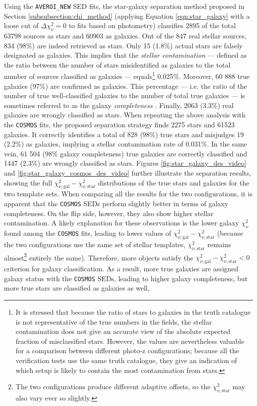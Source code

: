 Using the \texttt{AVEROI\_NEW} SED fits, the star-galaxy separation method proposed in Section \ref{subsubsection:chi_method} (applying Equation \ref{eqn:star_galaxy} with a loose cut of $\Delta \chi^2_{\nu} =0$ to fits based on \DESVIDEO photometry) classifies 2895 of the total \num{63 798} sources as stars and \num{60 903} as galaxies. Out of the 847 real stellar sources, 834 (98\%) are indeed retrieved as stars. Only 15 (1.8\%) actual stars are falsely designated as galaxies. This implies that the \textit{stellar contamination} --- defined as the ratio between the number of stars misidentified as galaxies to the total number of sources classified as galaxies \citep{2015MNRAS.450..666S} --- equals\footnote{It is stressed that because the ratio of stars to galaxies in the truth catalogue is not representative of the true numbers in the \DESVIDEO fields, the stellar contamination does not give an accurate view of the absolute expected fraction of misclassified stars. However, the values are nevertheless valuable for a comparison between different photo-z configurations; because all the verification tests use the same truth catalogue, they give an indication of which setup is likely to contain the most contamination from stars.} 0.025\%. Moreover, 60 888  true galaxies (97\%) are confirmed as galaxies. This percentage  --- i.e. the ratio of the number of true well-classified galaxies to the number of total true galaxies --- is sometimes referred to as the galaxy \textit{completeness} \citep{2015MNRAS.450..666S}. Finally, 2063 (3.3\%) real galaxies are wrongly classified as stars. When repeating the above analysis with the \texttt{COSMOS} fits, the proposed separation strategy finds 2275 stars and \num{61 523} galaxies. It correctly identifies a total of 828 (98\%) true stars and misjudges 19 (2.2\%) as galaxies, implying a stellar contamination rate of 0.031\%. In the same vein, 61 504 (98\% galaxy completeness) true galaxies are correctly classified and 1447 (2.3\%) are wrongly classified as stars. Figures \ref{fig:star_galaxy_des_video}  and \ref{fig:star_galaxy_cosmos_des_video} further illustrate the separation results, showing the full $\chi^2_{\nu,\mathrm{gal}} - \chi^2_{\nu,\mathrm{star}}$ distributions of the true stars and galaxies for the two template sets. When comparing all the results for the two configurations, it is apparent that the \texttt{COSMOS} SEDs perform slightly better in terms of galaxy completeness. On the flip side, however, they also show higher stellar contamination. A likely explanation for these observations is the lower galaxy $\chi_{\nu}^2$ found among the \texttt{COSMOS} fits, leading to lower values of $\chi^2_{\nu,\mathrm{gal}} - \chi^2_{\nu,\mathrm{star}}$ (because the two configurations use the same set of stellar templates, $\chi^2_{\nu,\mathrm{star}}$ remains almost\footnote{The two configurations produce different adaptive offsets, so the $\chi^2_{\nu,\mathrm{star}}$ may also vary ever so slightly.} entirely the same).  Therefore, more objects satisfy the $\chi^2_{\nu,\mathrm{gal}} - \chi^2_{\nu,\mathrm{star}} < 0 $ criterion for galaxy classification. As a result, more true galaxies are assigned galaxy status with the \texttt{COSMOS} SEDs, leading to higher galaxy completeness, but more true stars are classified as galaxies as well, 